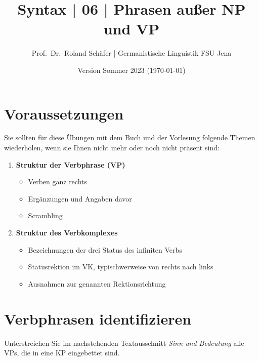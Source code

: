 \documentclass[12pt,a4paper,twoside]{article}
\author{Prof.\ Dr.\ Roland Schäfer | Germanistische Linguistik FSU Jena}
\title{Syntax | 06 | Phrasen außer NP und VP}
\date{Version Sommer 2023 (\today)}
\newcommand{\Lf}{
  \setlength{\itemsep}{1pt}
  \setlength{\parskip}{0pt}
  \setlength{\parsep}{0pt}
}
\begin{document}
\maketitle

\section*{Voraussetzungen}

Sie sollten für diese Übungen mit dem Buch und der Vorlesung folgende Themen wiederholen, wenn sie Ihnen nicht mehr oder noch nicht präsent sind:

\begin{enumerate}\Lf
  \item \textbf{Struktur der Verbphrase (VP)}
    \begin{itemize}\Lf
      \item Verben ganz rechts
      \item Ergänzungen und Angaben davor
      \item Scrambling
    \end{itemize}
  \item \textbf{Struktur des Verbkomplexes}
    \begin{itemize}\Lf
      \item Bezeichnungen der drei Status des infiniten Verbs
      \item Statusrektion im VK, typischwerweise von rechts nach links
      \item Ausnahmen zur genannten Rektionsrichtung
    \end{itemize}
\end{enumerate}

\section{Verbphrasen identifizieren}

Unterstreichen Sie im nachstehenden Textausschnitt \textit{Sinn und Bedeutung} alle VPs, die in eine KP eingebettet sind.
\end{document}
